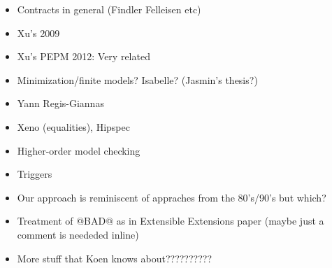 \begin{itemize}
  \item Contracts in general (Findler Felleisen etc)
  \item Xu's 2009
  \item Xu's PEPM 2012: Very related
  \item Minimization/finite models? Isabelle? (Jasmin's thesis?)
  \item Yann Regis-Giannas 
  \item Xeno (equalities), Hipspec 
  \item Higher-order model checking
  \item Triggers
  \item Our approach is reminiscent of appraches from the 80's/90's but which?
  \item Treatment of @BAD@ as in Extensible Extensions paper (maybe just a comment is neededed inline)
  \item More stuff that Koen knows about??????????
\end{itemize}
